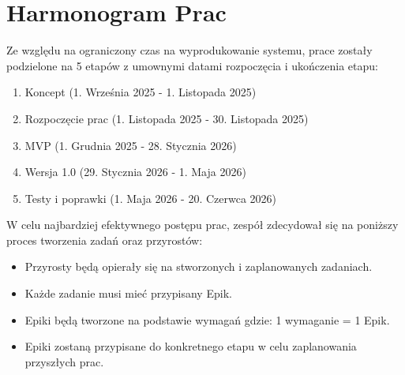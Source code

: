 \section{Harmonogram Prac}
\par Ze względu na ograniczony czas na wyprodukowanie systemu, prace zostały podzielone na 5 etapów z umownymi datami rozpoczęcia i ukończenia etapu:
\begin{enumerate}
    \item Koncept (1. Września 2025 - 1. Listopada 2025)
    \item Rozpoczęcie prac (1. Listopada 2025 - 30. Listopada 2025)
    \item \gls{MVP} (1. Grudnia 2025 - 28. Stycznia 2026)
    \item Wersja 1.0 (29. Stycznia 2026 - 1. Maja 2026)
    \item Testy i poprawki (1. Maja 2026 - 20. Czerwca 2026)
\end{enumerate}
\par W celu najbardziej efektywnego postępu prac, zespół zdecydował się na poniższy proces tworzenia zadań oraz przyrostów:
\begin{itemize}
    \item Przyrosty będą opierały się na stworzonych i zaplanowanych zadaniach.
    \item Każde zadanie musi mieć przypisany \gls{Epik}.
    \item \gls{Epik}i będą tworzone na podstawie wymagań gdzie: 1 wymaganie = 1 \gls{Epik}.
    \item \gls{Epik}i zostaną przypisane do konkretnego etapu w celu zaplanowania przyszłych prac.
\end{itemize}

